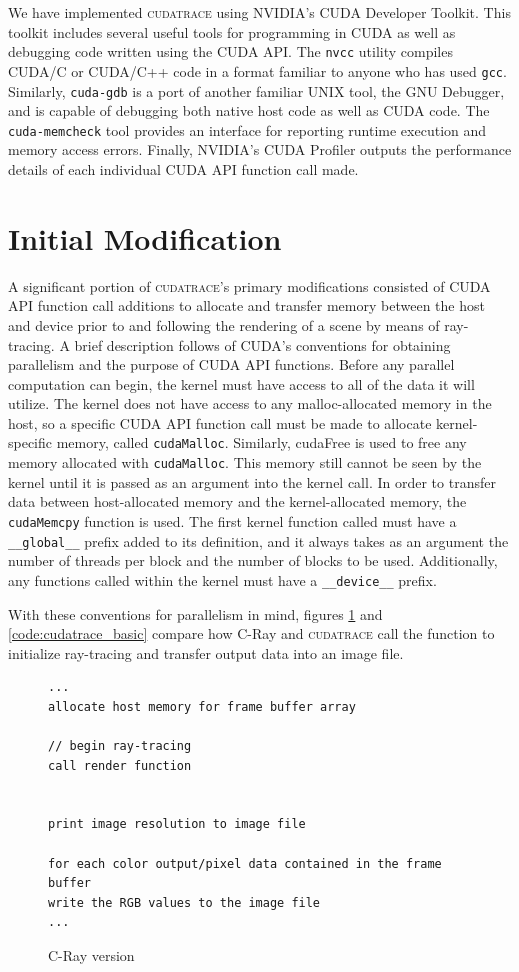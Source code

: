 \documentclass[12pt]{article}
\begin{document}
We have implemented \textsc{cudatrace} using NVIDIA’s CUDA Developer Toolkit. This toolkit includes several useful tools for programming in CUDA as well as debugging code written using the CUDA API. The \texttt{nvcc} utility compiles CUDA/C or CUDA/C++ code in a format familiar to anyone who has used \texttt{gcc}. Similarly, \texttt{cuda-gdb} is a port of another familiar UNIX tool, the GNU Debugger, and is capable of debugging both native host code as well as CUDA code. The \texttt{cuda-memcheck} tool provides an interface for reporting runtime execution and memory access errors. Finally, NVIDIA's CUDA Profiler outputs the performance details of each individual CUDA API function call made.


\section{Initial Modification}
A significant portion of \textsc{cudatrace}'s primary modifications consisted of CUDA API function call additions to allocate and transfer memory between the host and device prior to and following the rendering of a scene by means of ray-tracing. A brief description follows of CUDA’s conventions for obtaining parallelism and the purpose of CUDA API functions. Before any parallel computation can begin, the kernel must have access to all of the data it will utilize. The kernel does not have access to any malloc-allocated memory in the host, so a specific CUDA API function call must be made to allocate kernel-specific memory, called \texttt{cudaMalloc}. Similarly, cudaFree is used to free any memory allocated with \texttt{cudaMalloc}. This memory still cannot be seen by the kernel until it is passed as an argument into the kernel call. In order to transfer data between host-allocated memory and the kernel-allocated memory, the \texttt{cudaMemcpy} function is used. The first kernel function called must have a \texttt{\_\_global\_\_} prefix added to its definition, and it always takes as an argument the number of threads per block and the number of blocks to be used. Additionally, any functions called within the kernel must have a \texttt{\_\_device\_\_} prefix.    

With these conventions for parallelism in mind, figures \ref{code:c-ray_basic} and \ref{code:cudatrace_basic} compare how C-Ray and \textsc{cudatrace} call the function to initialize ray-tracing and transfer output data into an image file.

\begin{figure}
    \caption{C-Ray version} \label{code:c-ray_basic}
\begin{lstlisting}
...
allocate host memory for frame buffer array

// begin ray-tracing
call render function 


print image resolution to image file

for each color output/pixel data contained in the frame buffer
write the RGB values to the image file
...
\end{lstlisting}
\end{figure}
\end{document}
